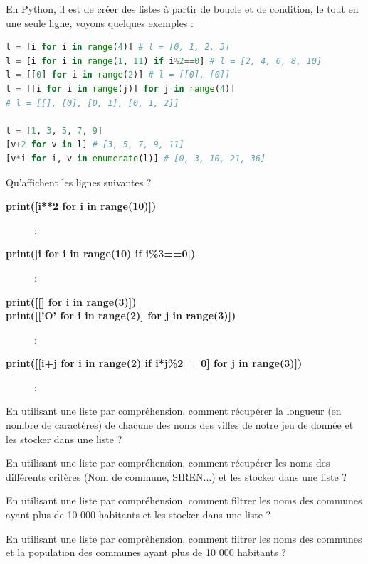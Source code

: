 \begin{Exercise}[title={Pour aller plus loin (les listes par compréhension)}]
En Python, il est de créer des listes à partir de boucle et de condition, le tout en une seule ligne, voyons quelques exemples :
\begin{lstlisting}[style=Pythonstyle, language=Python]
l = [i for i in range(4)] # l = [0, 1, 2, 3]
l = [i for i in range(1, 11) if i%2==0] # l = [2, 4, 6, 8, 10]
l = [[0] for i in range(2)] # l = [[0], [0]]
l = [[i for i in range(j)] for j in range(4)]
# l = [[], [0], [0, 1], [0, 1, 2]]

l = [1, 3, 5, 7, 9]
[v+2 for v in l] # [3, 5, 7, 9, 11]
[v*i for i, v in enumerate(l)] # [0, 3, 10, 21, 36]
\end{lstlisting}
\Question Qu'affichent les lignes suivantes ?
\begin{description}
    \item[\textbf{print([i**2 for i in range(10)])}] :
    \item[\textbf{print([i for i in range(10) if i\%3==0])}] :
    \item[\textbf{print([[] for i in range(3)])}] 
    \item[\textbf{print([['O' for i in range(2)] for j in range(3)])}] :
    \item[\textbf{print([[i+j for i in range(2) if i*j\%2==0] for j in range(3)])}] :
\end{description}

\Question En utilisant une liste par compréhension, comment récupérer la longueur (en nombre de caractères) de chacune des noms des villes de notre jeu de donnée et les stocker dans une liste ?\\
\emptybox{1.5cm}

\Question En utilisant une liste par compréhension, comment récupérer les noms des différents critères (Nom de commune, SIREN...) et les stocker dans une liste ?\\
\emptybox{1.5cm}

\Question En utilisant une liste par compréhension, comment filtrer les noms des communes ayant plus de 10 000 habitants et les stocker dans une liste ?\\
\emptybox{1.5cm}

\Question En utilisant une liste par compréhension, comment filtrer les noms des communes et la population des communes ayant plus de 10 000 habitants ?\\
\emptybox{1.5cm}
\end{Exercise}
